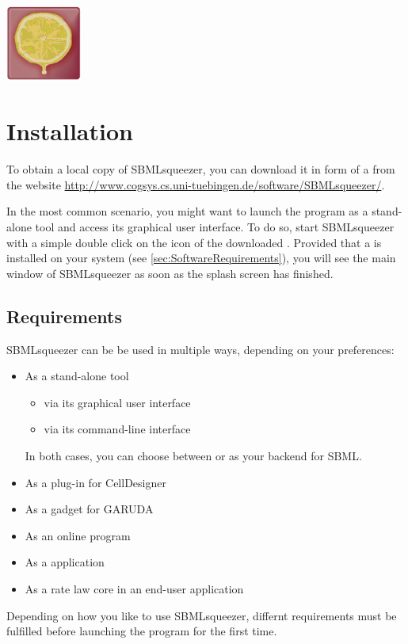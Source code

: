\vspace{3cm}
\begin{center}
\includegraphics[width=2.5cm]{img/LOGO.png}
\end{center}


\chapter{Installation}

To obtain a local copy of SBMLsqueezer, you can download it in form of a 
\JavaArchive from the website
\url{http://www.cogsys.cs.uni-tuebingen.de/software/SBMLsqueezer/}.

In the most common scenario, you might want to launch the program as a
stand-alone tool and access its graphical user interface. To do so,
start SBMLsqueezer with a simple double click on the icon of the downloaded
\JAR.
Provided that a \JVM is installed on your system 
(see \vref{sec:SoftwareRequirements}), you will see the main window of
SBMLsqueezer as soon as the splash screen has finished.

\section{Requirements}

SBMLsqueezer can be be used in multiple ways, depending on your preferences:
\begin{itemize}
  \item As a stand-alone tool
  \begin{itemize}
    \item via its graphical user interface
    \item via its command-line interface
  \end{itemize}
        In both cases, you can choose between \JSBML or \libSBML as your backend
        for SBML.
  \item As a plug-in for CellDesigner
  \item As a gadget for GARUDA
  \item As an online program
  \item As a \JavaWebStart application
  \item As a rate law core in an end-user application
\end{itemize}
Depending on how you like to use SBMLsqueezer, differnt requirements must be
fulfilled before launching the program for the first time.

